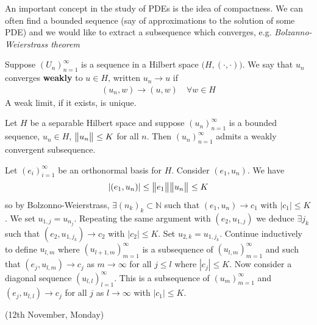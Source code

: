 \documentclass[10pt,a4paper]{report}
\newenvironment{proof}
{\begin{changemargin}{1cm}{0.5cm} 
	}%
	{\end{changemargin}
}
\begin{document}
An important concept in the study of PDEs is the idea of compactness. We can often find a bounded sequence (say of approximations to the solution of some PDE) and we would like to extract a subsequence which converges, e.g. \emph{Bolzanno-Weierstrass theorem}
\s

 Suppose $(U_n)_{n=1}^{\infty}$ is a sequence in a Hilbert space $\big( H,(\cdot,\cdot) \big)$. We say that $u_n$ converges \textbf{weakly} to $u\in H$, written $u_n \rightarrow u$ if
\begin{align*}
(u_n, w) \rightarrow (u,w) \quad \forall w\in H
\end{align*}
A weak limit, if it exists, is unique.
\s

\thm Let $H$ be a separable Hilbert space and suppose $(u_n)_{n=1}^{\infty}$ is a bounded sequence, $u_n \in H$, $\bigl\lVert u_n\bigr\rVert_{} \leq K$ for all $n$. Then $(u_n)_{n=1}^{\infty}$ admits a weakly convergent subsequence.
\begin{proof}
\pf Let $(e_i)_{i=1}^{\infty}$ be an orthonormal basis for $H$. Consider $(e_1, u_n)$. We have
\begin{align*}
|(e_1, u_n)| \leq \bigl\lVert e_1\bigr\rVert_{} \bigl\lVert u_n\bigr\rVert_{} \leq K
\end{align*}
so by Bolzonno-Weierstrass, $\exists (n_k)_{k} \subset \mathbb{N}$ such that $(e_1, u_n) \rightarrow c_1$ with $|c_1| \leq K$. We set $u_{1,j} = u_{n_j}$. Repeating the same argument with $(e_2, u_{1,j})$ we deduce $\exists j_k$ such that $(e_2, u_{1,j_k}) \rightarrow c_2$ with $|c_2| \leq K$. Set $u_{2,k} = u_{1,j_k}$. Continue inductively to define $u_{l,m}$ where $(u_{l+1,m})_{m=1}^{\infty}$ is a subsequence of $(u_{l,m})_{m=1}^{\infty}$ and such that $(e_j, u_{l,m}) \rightarrow c_j$ as $m\rightarrow \infty$ for all $j\leq l$ where $|c_j| \leq K$. Now consider a diagonal sequence $(u_{l,l})_{l=1}^{\infty}$. This is a subsequence of $(u_m)_{m=1}^{\infty}$ and $(e_j, u_{l,l}) \rightarrow c_j$ for all $j$ as $l\rightarrow \infty$ with $|c_1| \leq K$.
\end{proof}
\s

\newday

(12th November, Monday)
\s
\end{document}
